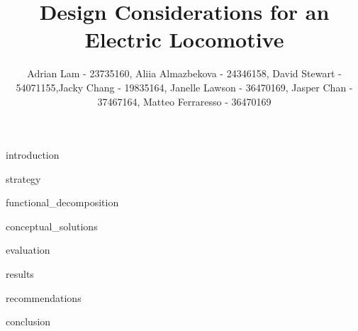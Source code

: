 \documentclass{report}
\title{Design Considerations for an Electric Locomotive}
\author{Adrian Lam - 23735160, Aliia Almazbekova - 24346158, David Stewart - 54071155,Jacky Chang - 19835164, Janelle Lawson - 36470169, Jasper Chan - 37467164, Matteo Ferraresso - 36470169}
\begin{document}
\maketitle

{introduction}
\newpage

{strategy}
\newpage

{functional_decomposition}
\newpage

{conceptual_solutions}
\newpage

{evaluation}
\newpage

{results}
\newpage

{recommendations}
\newpage

{conclusion}
\newpage
\end{document}
